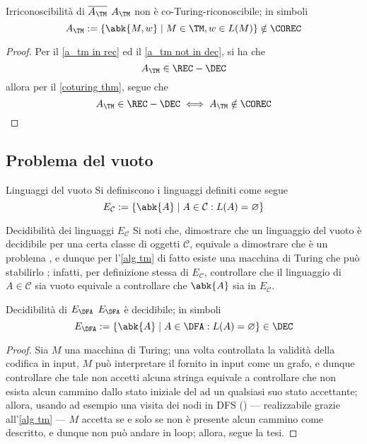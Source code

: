 \documentclass[a4paper, 12pt]{report}
\begin{document}
    \begin{framedcor}[label={a_tm not in corec}]{Irriconoscibilità di $\overline{A_\TM}$}
        $A_\TM$ non è co-Turing-riconoscibile; in simboli $$A_\TM := \{\abk{M, w} \mid M \in \TM, w \in L(M)\} \notin \COREC$$
    \end{framedcor}

    \begin{proof}
        Per il \cref{a_tm in rec} ed il \cref{a_tm not in dec}, si ha che $$A_\TM \in \REC - \DEC$$ allora per il \cref{coturing thm}, segue che $$A_\TM \in \REC - \DEC \iff A_\TM \notin \COREC$$
    \end{proof}

    \subsection{Problema del vuoto}

    \begin{frameddefn}{Linguaggi del vuoto}
        Si definiscono  i linguaggi definiti come segue $$E_\mathcal{C} := \{\abk{A} \mid A \in \mathcal{C}: L(A) = \varnothing\}$$
    \end{frameddefn}

    \begin{framedobs}{Decidibilità dei linguaggi $E_\mathcal C$}
        Si noti che, dimostrare che un linguaggio del vuoto è decidibile per una certa classe di oggetti $\mathcal{C}$, equivale a dimostrare che  è un problema , e dunque per l'\cref{alg tm} di fatto esiste una macchina di Turing che può stabilirlo ; infatti, per definizione stessa di $E_\mathcal C$, controllare che il linguaggio di $A \in \mathcal{C}$ sia vuoto equivale a controllare che $\abk{A}$ sia in $E_\mathcal{C}$.
    \end{framedobs}

    \begin{framedthm}[label={dec e_dfa}]{Decidibilità di $E_\DFA$}
        $E_\DFA$ è decidibile; in simboli $$E_\DFA := \{\abk{A} \mid A \in \DFA: L(A) = \varnothing \} \in \DEC$$
    \end{framedthm}

    \begin{proof}
        Sia $M$ una macchina di Turing; una volta controllata la validità della codifica in input, $M$ può interpretare il \DFA fornito in input come un grafo, e dunque controllare che tale \DFA non accetti alcuna stringa equivale a controllare che non esista alcun cammino dallo stato iniziale del \DFA ad un qualsiasi suo stato accettante; allora, usando ad esempio una visita dei nodi in DFS () --- realizzabile grazie all'\cref{alg tm} --- $M$ accetta se e solo se non è presente alcun cammino come descritto, e dunque non può andare in loop; allora, segue la tesi.
    \end{proof}
\end{document}
